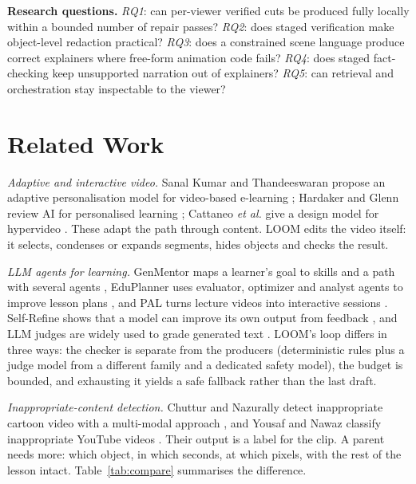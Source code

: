 \documentclass[conference,a4paper]{IEEEtran}
\newcommand{\tab}[1]{Table~\ref{#1}}
\begin{document}
\textbf{Research questions.} \emph{RQ1}: can per-viewer verified cuts be produced fully locally within a bounded number
of repair passes? \emph{RQ2}: does staged verification make object-level redaction practical? \emph{RQ3}: does a
constrained scene language produce correct explainers where free-form animation code fails? \emph{RQ4}: does staged
fact-checking keep unsupported narration out of explainers? \emph{RQ5}: can retrieval and orchestration stay
inspectable to the viewer?

\section{Related Work}
\emph{Adaptive and interactive video.} Sanal Kumar and Thandeeswaran propose an adaptive personalisation model for
video-based e-learning \cite{sanal2024}; Hardaker and Glenn review AI for personalised learning \cite{hardaker2025};
Cattaneo \emph{et al.} give a design model for hypervideo \cite{cattaneo2019}. These adapt the path through content.
LOOM edits the video itself: it selects, condenses or expands segments, hides objects and checks the result.

\emph{LLM agents for learning.} GenMentor maps a learner's goal to skills and a path with several agents
\cite{genmentor}, EduPlanner uses evaluator, optimizer and analyst agents to improve lesson plans \cite{eduplanner},
and PAL turns lecture videos into interactive sessions \cite{pal}. Self-Refine shows that a model can improve its own
output from feedback \cite{selfrefine}, and LLM judges are widely used to grade generated text \cite{llmjudge}. LOOM's
loop differs in three ways: the checker is separate from the producers (deterministic rules plus a judge model from a
different family and a dedicated safety model), the budget is bounded, and exhausting it yields a safe fallback rather
than the last draft.

\emph{Inappropriate-content detection.} Chuttur and Nazurally detect inappropriate cartoon video with a multi-modal
approach \cite{chuttur2022}, and Yousaf and Nawaz classify inappropriate YouTube videos \cite{yousaf2022}. Their output
is a label for the clip. A parent needs more: which object, in which seconds, at which pixels, with the rest of the
lesson intact. \tab{tab:compare} summarises the difference.
\end{document}
